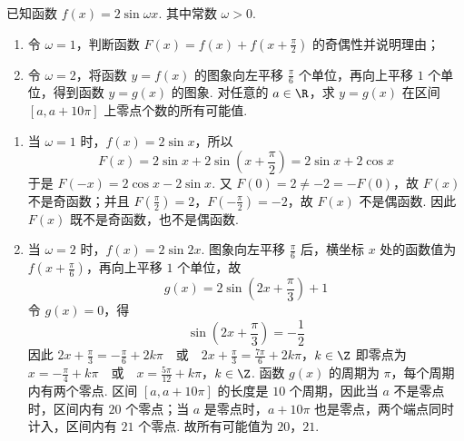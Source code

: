 \begin{problem}
已知函数 \(f(x) = 2\sin \omega x\). 其中常数 \(\omega > 0\).

\begin{enumerate}
\item 令 \(\omega = 1\)，判断函数 \(F(x) = f(x) + f\left(x + \frac{\pi}{2}\right)\) 的奇偶性并说明理由；
\item 令 \(\omega = 2\)，将函数 \(y = f(x)\) 的图象向左平移 \(\frac{\pi}{6}\) 个单位，再向上平移 \(1\) 个单位，得到函数 \(y = g(x)\) 的图象. 对任意的 \(a \in \R\)，求 \(y = g(x)\) 在区间 \([a, a + 10\pi]\) 上零点个数的所有可能值.
\end{enumerate}

\begin{solution}
\begin{enumerate}
\item 当 \(\omega=1\) 时，\(f(x)=2\sin x\)，所以
\[
F(x)=2\sin x+2\sin\left(x+\frac{\pi}{2}\right)=2\sin x+2\cos x
\]
于是 \(F(-x)=2\cos x-2\sin x\). 又 \(F(0)=2\neq-2=-F(0)\)，故 \(F(x)\) 不是奇函数；并且 \(F\left(\frac{\pi}{2}\right)=2\)，\(F\left(-\frac{\pi}{2}\right)=-2\)，故 \(F(x)\) 不是偶函数. 因此 \(F(x)\) 既不是奇函数，也不是偶函数.
\item 当 \(\omega=2\) 时，\(f(x)=2\sin2x\). 图象向左平移 \(\frac{\pi}{6}\) 后，横坐标 \(x\) 处的函数值为 \(f\left(x+\frac{\pi}{6}\right)\)，再向上平移 \(1\) 个单位，故
\[
g(x)=2\sin\left(2x+\frac{\pi}{3}\right)+1
\]
令 \(g(x)=0\)，得
\[
\sin\left(2x+\frac{\pi}{3}\right)=-\frac{1}{2}
\]
因此
\(2x+\frac{\pi}{3}=-\frac{\pi}{6}+2k\pi\quad\text{或}\quad2x+\frac{\pi}{3}=\frac{7\pi}{6}+2k\pi\)，\(k\in\Z\)
即零点为
\(x=-\frac{\pi}{4}+k\pi\quad\text{或}\quad x=\frac{5\pi}{12}+k\pi\)，\(k\in\Z\).
函数 \(g(x)\) 的周期为 \(\pi\)，每个周期内有两个零点. 区间 \([a,a+10\pi]\) 的长度是 \(10\) 个周期，因此当 \(a\) 不是零点时，区间内有 \(20\) 个零点；当 \(a\) 是零点时，\(a+10\pi\) 也是零点，两个端点同时计入，区间内有 \(21\) 个零点. 故所有可能值为 \(20\)，\(21\).
\end{enumerate}
\end{solution}
\end{problem}

